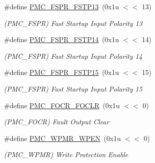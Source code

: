 \begin{DoxyCompactItemize}
\mbox{\label{group__SAMS70__PMC_gab0cb8b39ace8a891b00b8bc8d961acdd}} 
\#define \mbox{\hyperlink{group__SAMS70__PMC_gab0cb8b39ace8a891b00b8bc8d961acdd}{P\+M\+C\+\_\+\+F\+S\+P\+R\+\_\+\+F\+S\+T\+P13}}~(0x1u $<$$<$ 13)
\begin{DoxyCompactList}\small\item\em (P\+M\+C\+\_\+\+F\+S\+PR) Fast Startup Input Polarity 13 \end{DoxyCompactList}\item 
\mbox{\label{group__SAMS70__PMC_ga4d6fe77d7d37e36ab3e289aaa9b9ab31}} 
\#define \mbox{\hyperlink{group__SAMS70__PMC_ga4d6fe77d7d37e36ab3e289aaa9b9ab31}{P\+M\+C\+\_\+\+F\+S\+P\+R\+\_\+\+F\+S\+T\+P14}}~(0x1u $<$$<$ 14)
\begin{DoxyCompactList}\small\item\em (P\+M\+C\+\_\+\+F\+S\+PR) Fast Startup Input Polarity 14 \end{DoxyCompactList}\item 
\mbox{\label{group__SAMS70__PMC_gaeb71bc909c4ed234066c0acbe8aa2452}} 
\#define \mbox{\hyperlink{group__SAMS70__PMC_gaeb71bc909c4ed234066c0acbe8aa2452}{P\+M\+C\+\_\+\+F\+S\+P\+R\+\_\+\+F\+S\+T\+P15}}~(0x1u $<$$<$ 15)
\begin{DoxyCompactList}\small\item\em (P\+M\+C\+\_\+\+F\+S\+PR) Fast Startup Input Polarity 15 \end{DoxyCompactList}\item 
\mbox{\label{group__SAMS70__PMC_ga45165c3f02e78973fb1943d7300c05dd}} 
\#define \mbox{\hyperlink{group__SAMS70__PMC_ga45165c3f02e78973fb1943d7300c05dd}{P\+M\+C\+\_\+\+F\+O\+C\+R\+\_\+\+F\+O\+C\+LR}}~(0x1u $<$$<$ 0)
\begin{DoxyCompactList}\small\item\em (P\+M\+C\+\_\+\+F\+O\+CR) Fault Output Clear \end{DoxyCompactList}\item 
\mbox{\label{group__SAMS70__PMC_ga48aab300f7348660f60362ea150d8785}} 
\#define \mbox{\hyperlink{group__SAMS70__PMC_ga48aab300f7348660f60362ea150d8785}{P\+M\+C\+\_\+\+W\+P\+M\+R\+\_\+\+W\+P\+EN}}~(0x1u $<$$<$ 0)
\begin{DoxyCompactList}\small\item\em (P\+M\+C\+\_\+\+W\+P\+MR) Write Protection Enable \end{DoxyCompactList}\item 
$$
\end{DoxyCompactItemize}
